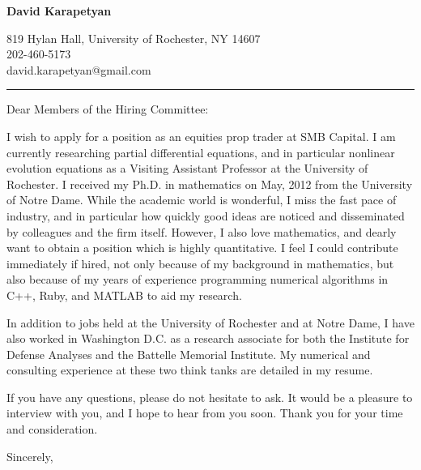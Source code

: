 \documentclass[12pt]{letter}
\date{\vspace{0.5cm}\flushleft}
\begin{document}
\begin{letter}{}
\begin{center}
{\bf {\Large David Karapetyan}}
\end{center}

\begin{center}
{819 Hylan Hall, University of Rochester, NY 14607  \\ 
202-460-5173 \\  david.karapetyan@gmail.com
}
\end{center}
\hrule

\opening{Dear Members of the Hiring Committee:\\}
%

%
I wish to apply for a position as an equities prop trader at SMB Capital. I am currently researching partial differential equations, and in particular nonlinear
evolution equations as a Visiting Assistant Professor at the University of
Rochester. I received my Ph.D. in mathematics on May, 2012 from the University
of Notre Dame. While the academic world is wonderful, I miss the fast pace of
industry, and in particular how quickly good ideas are noticed and disseminated by colleagues and the firm itself. However, I also love mathematics, and dearly want to obtain
a position which is highly quantitative. I feel I could contribute immediately if hired, not only because of
my background in mathematics, but also because of my years of experience
programming numerical algorithms in C++, Ruby, and MATLAB to aid my research.

In addition to jobs held at the University of Rochester and at Notre Dame, I have
also worked in Washington D.C. as a research associate for both the Institute
for Defense Analyses and the Battelle Memorial Institute. My numerical and
consulting experience at these two think tanks are detailed in my resume. 

If you have any questions, please do not hesitate to ask. It would be a
pleasure to interview with you, and I hope to hear from you soon. Thank you for
your time and consideration. 

\closing{Sincerely,}


\end{letter}
\end{document}
